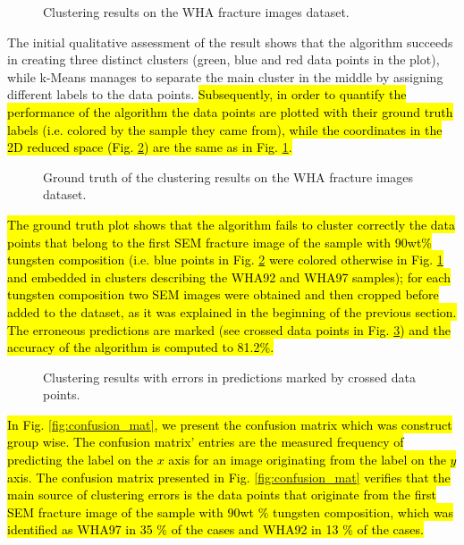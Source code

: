 \documentclass[authoryear,preprint,review,12pt, singleside]{elsarticle}
\begin{document}
\begin{figure}[!h]
	\centering
	\caption{Clustering results on the WHA fracture images dataset.}
	\label{fig:cluster_result}
\end{figure}
  
The initial qualitative assessment of the result shows that the algorithm succeeds in creating three distinct clusters (green, blue and red data points in the plot), while k-Means manages to separate the main cluster in the middle by assigning different labels to the data points. \hl{Subsequently, in order to quantify the performance of the algorithm the data points are plotted with their ground truth labels (i.e. colored by the sample they came from), while the coordinates in the 2D reduced space (Fig. {\ref{fig:cluster_result_gt}}) are the same as in Fig. {\ref{fig:cluster_result}}.}  


\begin{figure}[!h]
	\centering
	\caption{Ground truth of the clustering results on the WHA fracture images dataset.}
	\label{fig:cluster_result_gt}
\end{figure}

\hl{The ground truth plot shows that the algorithm fails to cluster correctly the data points that belong to the first SEM fracture image of the sample with 90wt\% tungsten composition (i.e. blue points in Fig.  {\ref{fig:cluster_result_gt}} were colored otherwise in Fig. {\ref{fig:cluster_result}} and embedded in clusters describing the WHA92 and WHA97 samples); for each tungsten composition  two SEM images were obtained and then cropped before added to the dataset, as it was explained in the beginning of the previous section. The erroneous predictions are marked (see crossed data points in Fig. {\ref{fig:cluster_result_errors}}) and the accuracy of the algorithm is computed to 81.2\%.}



\begin{figure}[!h]
	\centering
	\caption{Clustering results with errors in predictions marked by crossed data points.}
	\label{fig:cluster_result_errors}
\end{figure}

\hl{In Fig. {\ref{fig:confusion_mat}}, we present the confusion matrix which was construct group wise. The confusion matrix' entries are the measured  frequency of predicting the label on the $x$ axis for an image originating from the label on the $y$ axis. The confusion matrix presented in Fig. {\ref{fig:confusion_mat}} verifies that the main source of clustering errors is the data points that originate from the first SEM fracture image of the  sample with 90wt $\%$ tungsten composition, which was identified as WHA97 in 35 $\%$ of the cases and WHA92 in 13 $\%$ of the cases. }
\end{document}

